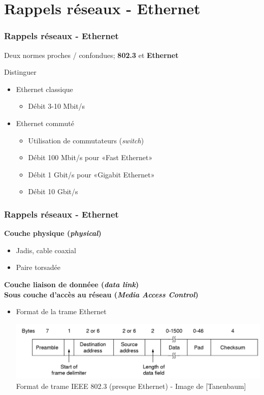 \section{Rappels réseaux - Ethernet}

\begin{frame}[fragile]
  \frametitle{Rappels réseaux - Ethernet}
Deux normes proches / confondues; \textbf{802.3} et \textbf{Ethernet}

Distinguer
\begin{itemize}
	\item Ethernet classique
	\begin{itemize}
		\item Débit 3-10 Mbit/s
	\end{itemize}
	\item Ethernet commuté
	\begin{itemize}
		\item Utilisation de commutateurs (\textit{switch})
		\item Débit 100 Mbit/s pour «Fast Ethernet»
		\item Débit 1 Gbit/s pour «Gigabit Ethernet»
		\item Débit 10 Gbit/s
	\end{itemize}
\end{itemize}
\end{frame}

\begin{frame}[fragile]
  \frametitle{Rappels réseaux - Ethernet}
{\large\bf Couche physique (\textit{physical})}
\begin{itemize}
	\item Jadis, cable coaxial
	\item Paire torsadée
\end{itemize}

\vspace{.7cm}
{\large\bf Couche liaison de donnéee (\textit{data link})}\\
{\bf Sous couche d'accès au réseau (\textit{Media Access Control})}
\begin{itemize}
	\item Format de la trame Ethernet \\
	\begin{center}
		\includegraphics[width=.90\linewidth]{img/4-21.jpg} \\
		{\scriptsize Format de trame IEEE 802.3 (presque Ethernet) - Image de
		[Tanenbaum]}
	\end{center}
\end{itemize}
\end{frame}

